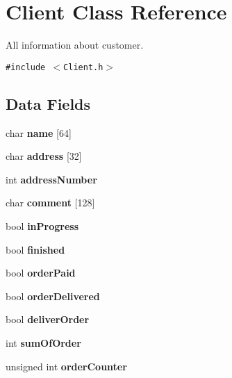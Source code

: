 \hypertarget{class_client}{
\section{Client Class Reference}
\label{class_client}
}
All information about customer.  


{\tt \#include $<$Client.h$>$}

\subsection*{Data Fields}
\begin{CompactItemize}
\item 
\hypertarget{class_client_275f6727040426992bb1c8e247d38cde}{
char {\bf name} \mbox{[}64\mbox{]}}
\label{class_client_275f6727040426992bb1c8e247d38cde}

\item 
\hypertarget{class_client_06a8d016fa013b9fc60bcc24da937701}{
char {\bf address} \mbox{[}32\mbox{]}}
\label{class_client_06a8d016fa013b9fc60bcc24da937701}

\item 
\hypertarget{class_client_6ab3066cc6893cf6833b2871ecdebaf2}{
int {\bf address\-Number}}
\label{class_client_6ab3066cc6893cf6833b2871ecdebaf2}

\item 
\hypertarget{class_client_34824e2772f77c71f2d3778354d68b1c}{
char {\bf comment} \mbox{[}128\mbox{]}}
\label{class_client_34824e2772f77c71f2d3778354d68b1c}

\item 
\hypertarget{class_client_292db71ff1a82008b52bc6f74bd0419e}{
bool {\bf in\-Progress}}
\label{class_client_292db71ff1a82008b52bc6f74bd0419e}

\item 
\hypertarget{class_client_a5d7ceb2c59b8cee46c2953fec9abc19}{
bool {\bf finished}}
\label{class_client_a5d7ceb2c59b8cee46c2953fec9abc19}

\item 
\hypertarget{class_client_8498e9222401c9034d4e5a26970a3400}{
bool {\bf order\-Paid}}
\label{class_client_8498e9222401c9034d4e5a26970a3400}

\item 
\hypertarget{class_client_63c4891c26137238d3075aa6a395c235}{
bool {\bf order\-Delivered}}
\label{class_client_63c4891c26137238d3075aa6a395c235}

\item 
\hypertarget{class_client_48e3b11844a6747c24de0ff69018f775}{
bool {\bf deliver\-Order}}
\label{class_client_48e3b11844a6747c24de0ff69018f775}

\item 
\hypertarget{class_client_89b86d03136dc2f044d7669137baf6b5}{
int {\bf sum\-Of\-Order}}
\label{class_client_89b86d03136dc2f044d7669137baf6b5}

\item 
\hypertarget{class_client_25f95fa8cae78c29d5fe90cb9879944a}{
unsigned int {\bf order\-Counter}}
\label{class_client_25f95fa8cae78c29d5fe90cb9879944a}

\end{CompactItemize}
